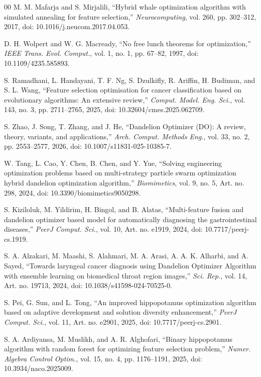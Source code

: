 \begin{thebibliography}{00}
 M. M. Mafarja and S. Mirjalili, ``Hybrid whale optimization algorithm with simulated annealing for feature selection,'' \textit{Neurocomputing}, vol. 260, pp. 302--312, 2017, doi: 10.1016/j.neucom.2017.04.053.

 D. H. Wolpert and W. G. Macready, ``No free lunch theorems for optimization,'' \textit{IEEE Trans. Evol. Comput.}, vol. 1, no. 1, pp. 67--82, 1997, doi: 10.1109/4235.585893.

 S. Ramadhani, L. Handayani, T. F. Ng, S. Dzulkifly, R. Ariffin, H. Budiman, and S. L. Wang, ``Feature selection optimisation for cancer classification based on evolutionary algorithms: An extensive review,'' \textit{Comput. Model. Eng. Sci.}, vol. 143, no. 3, pp. 2711--2765, 2025, doi: 10.32604/cmes.2025.062709.

 S. Zhao, J. Song, T. Zhang, and J. He, ``Dandelion Optimizer (DO): A review, theory, variants, and applications,'' \textit{Arch. Comput. Methods Eng.}, vol. 33, no. 2, pp. 2553--2577, 2026, doi: 10.1007/s11831-025-10385-7.

 W. Tang, L. Cao, Y. Chen, B. Chen, and Y. Yue, ``Solving engineering optimization problems based on multi-strategy particle swarm optimization hybrid dandelion optimization algorithm,'' \textit{Biomimetics}, vol. 9, no. 5, Art. no. 298, 2024, doi: 10.3390/biomimetics9050298.

 S. Kiziloluk, M. Yildirim, H. Bingol, and B. Alatas, ``Multi-feature fusion and dandelion optimizer based model for automatically diagnosing the gastrointestinal diseases,'' \textit{PeerJ Comput. Sci.}, vol. 10, Art. no. e1919, 2024, doi: 10.7717/peerj-cs.1919.

 S. A. Alzakari, M. Maashi, S. Alahmari, M. A. Arasi, A. A. K. Alharbi, and A. Sayed, ``Towards laryngeal cancer diagnosis using Dandelion Optimizer Algorithm with ensemble learning on biomedical throat region images,'' \textit{Sci. Rep.}, vol. 14, Art. no. 19713, 2024, doi: 10.1038/s41598-024-70525-0.

 S. Pei, G. Sun, and L. Tong, ``An improved hippopotamus optimization algorithm based on adaptive development and solution diversity enhancement,'' \textit{PeerJ Comput. Sci.}, vol. 11, Art. no. e2901, 2025, doi: 10.7717/peerj-cs.2901.

 S. A. Ardiyansa, M. Muslikh, and A. R. Alghofari, ``Binary hippopotamus algorithm with random forest for optimizing feature selection problem,'' \textit{Numer. Algebra Control Optim.}, vol. 15, no. 4, pp. 1176--1191, 2025, doi: 10.3934/naco.2025009.


\end{thebibliography}
